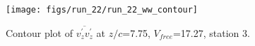 \begin{figure}[H]
\centering
\texttt{[image: figs/run\_22/run\_22\_ww\_contour]}
\caption{Contour plot of $\overline{v_{z}^{\prime} v_{z}^{\prime}}$ at $z/c$=7.75, $V_{free}$=17.27, station 3.}
\label{fig:run_22_ww_contour}
\end{figure}


